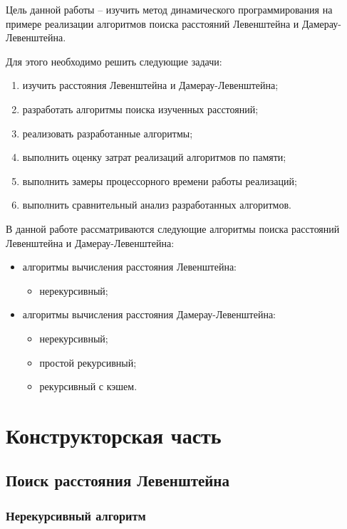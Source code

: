 \documentclass[oneside, a4paper, 12pt]{article}
\begin{document}
Цель данной работы -- изучить метод динамического программирования
на примере реализации алгоритмов поиска расстояний Левенштейна и
Дамерау-Левенштейна.

Для этого необходимо решить следующие задачи:

\begin{enumerate}
    \item изучить расстояния Левенштейна и Дамерау-Левенштейна;
    \item разработать алгоритмы поиска изученных расстояний;
    \item реализовать разработанные алгоритмы;
    \item выполнить оценку затрат реализаций алгоритмов по памяти;
    \item выполнить замеры процессорного времени работы реализаций;
    \item выполнить сравнительный анализ разработанных алгоритмов.
\end{enumerate}

В данной работе рассматриваются следующие алгоритмы поиска
расстояний Левенштейна и Дамерау-Левенштейна:

\begin{itemize}
    \item алгоритмы вычисления расстояния Левенштейна:
    \begin{itemize}
        \item нерекурсивный;
    \end{itemize}
    \item алгоритмы вычисления расстояния Дамерау-Левенштейна:
    \begin{itemize}
        \item нерекурсивный;
        \item простой рекурсивный;
        \item рекурсивный с кэшем.
    \end{itemize}
\end{itemize}

\section{Конструкторская часть}

\subsection{Поиск расстояния Левенштейна}

\subsubsection{Нерекурсивный алгоритм}
\end{document}

